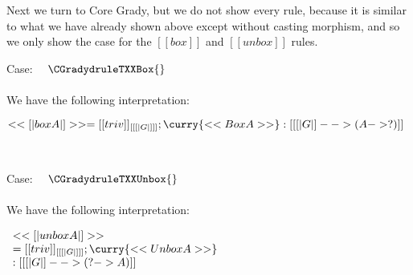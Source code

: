   Next we turn to Core Grady, but we do not show every rule, because
  it is similar to what we have already shown above except without
  casting morphism, and so we only show the case for the $[[box]]$ and
  $[[unbox]]$ rules.
\begin{description}
\item Case: $\quad \CGradydruleTXXBox{}$\\
  \\
  \noindent
  We have the following interpretation:
  \begin{center}
    \begin{math}
      << [| box A |] >> = [[triv]]_{[[ [| G |] ]]};\curry{<<Box A>>} : [[ [| G |] --> (A -> ?) ]]
    \end{math}
  \end{center}
  \ \\
\item Case: $\quad \CGradydruleTXXUnbox{}$\\
  \\
  \noindent
  We have the following interpretation:
  \begin{center}
    \begin{math}
      \begin{array}{lll}
        << [| unbox A |] >> \\
        = [[triv]]_{[[ [| G |] ]]};\curry{<<Unbox A>>}\\
        : [[ [| G |] --> (? -> A)]]
      \end{array}
    \end{math}
  \end{center}
  
\end{description}


